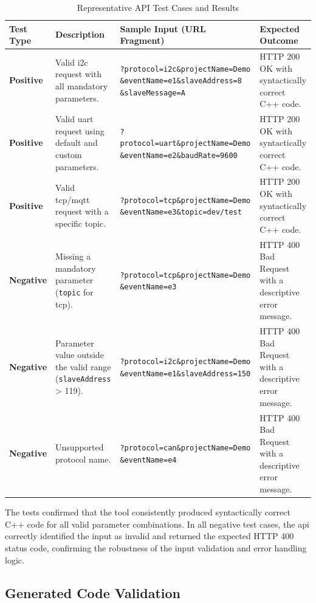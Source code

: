 \begin{table}[h!]
\centering
\caption{Representative API Test Cases and Results}
\label{tab:api_test_cases}
\begin{tabular}{|l|p{2.5cm}|p{6cm}|p{3.5cm}|}
\hline
\textbf{Test Type} & \textbf{Description} & \textbf{Sample Input (URL Fragment)} & \textbf{Expected Outcome} \\ \hline
\textbf{Positive} & Valid \gls{i2c} request with all mandatory parameters. & \texttt{?protocol=\gls{i2c}\&projectName=Demo \&eventName=e1\&slaveAddress=8 \&slaveMessage=A} & HTTP 200 OK with syntactically correct C++ code. \\ \hline
\textbf{Positive} & Valid \gls{uart} request using default and custom parameters. & \texttt{?protocol=uart\&projectName=Demo \&eventName=e2\&baudRate=9600} & HTTP 200 OK with syntactically correct C++ code. \\ \hline
\textbf{Positive} & Valid \gls{tcp}/\gls{mqtt} request with a specific topic. & \texttt{?protocol=tcp\&projectName=Demo \&eventName=e3\&topic=dev/test} & HTTP 200 OK with syntactically correct C++ code. \\ \hline
\textbf{Negative} & Missing a mandatory parameter (\texttt{topic} for \gls{tcp}). & \texttt{?protocol=tcp\&projectName=Demo \&eventName=e3} & HTTP 400 Bad Request with a descriptive error message. \\ \hline
\textbf{Negative} & Parameter value outside the valid range (\texttt{slaveAddress} > 119). & \texttt{?protocol=\gls{i2c}\&projectName=Demo \&eventName=e1\&slaveAddress=150} & HTTP 400 Bad Request with a descriptive error message. \\ \hline
\textbf{Negative} & Unsupported protocol name. & \texttt{?protocol=can\&projectName=Demo \&eventName=e4} & HTTP 400 Bad Request with a descriptive error message. \\ \hline
\end{tabular}
\end{table}

  The tests confirmed that the tool consistently produced syntactically correct C++ code for all valid parameter combinations.   In all negative test cases, the \gls{api} correctly identified the input as invalid and returned the expected HTTP 400 status code, confirming the robustness of the input validation and error handling logic.

\subsection{Generated Code Validation}
\label{subsec:code_validation}

